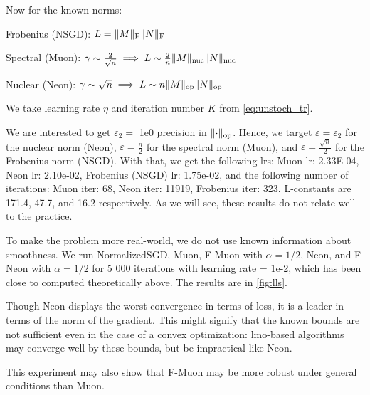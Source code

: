 \documentclass{article} %
\renewcommand{\epsilon}{\varepsilon}
\DeclarePairedDelimiter{\normf}{\|}{\|_\mathrm{F}}
\DeclarePairedDelimiter{\norms}{\|}{\|_{\mathrm{op}}}
\DeclarePairedDelimiter{\normn}{\|}{\|_{\mathrm{nuc}}}
\begin{document}
    Now for the known norms:

    Frobenius (NSGD): $L = \normf{M} \normf{N}$

    Spectral (Muon): $\gamma \sim \frac{2}{\sqrt{n}} \implies L \sim \frac{2}{n}\normn{M}\normn{N}$
    
    Nuclear (Neon): $\gamma \sim \sqrt{n} \implies L \sim n\norms{M}\norms{N}$

    We take learning rate $\eta$ and iteration number $K$ from \cref{eq:unstoch_tr}.


    We are interested to get $\epsilon_2=$ 1e0 precision in $\norms{\cdot}$. Hence, we target $\epsilon = \epsilon_2$ for the nuclear norm (Neon), $\epsilon = \frac{n}{2}$ for the spectral norm (Muon), and $\epsilon = \frac{\sqrt{n}}{2}$ for the Frobenius norm (NSGD).
    With that, we get the following lrs: Muon lr: 2.33E-04, Neon lr: 2.10e-02, Frobenius (NSGD) lr: 1.75e-02, and the following number of iterations: Muon iter: 68, Neon iter: 11919, Frobenius iter: 323. L-constants are 171.4, 47.7, and 16.2 respectively. As we will see, these results do not relate well to the practice.

    To make the problem more real-world, we do not use known information about smoothness. We run NormalizedSGD, Muon, F-Muon with $\alpha=1/2$, Neon, and F-Neon with $\alpha=1/2$ for 5 000 iterations with learning rate = 1e-2, which has been close to computed theoretically above. The results are in \cref{fig:lls}.

    Though Neon displays the worst convergence in terms of loss, it is a leader in terms of the norm of the gradient. This might signify that the known bounds are not sufficient even in the case of a convex optimization: lmo-based algorithms may converge well by these bounds, but be impractical like Neon.

    This experiment may also show that F-Muon may be more robust under general conditions than Muon.
\end{document}
